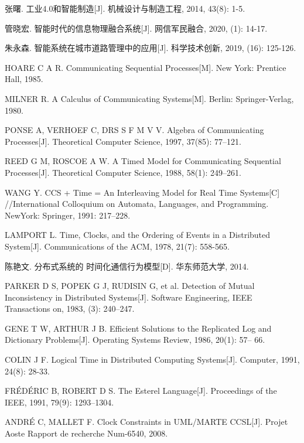 \begin{thebibliography}{2}
张曙. 工业4.0和智能制造[J]. 机械设计与制造工程, 2014, 43(8): 1-5.

管晓宏. 智能时代的信息物理融合系统[J]. 网信军民融合, 2020, (1): 14-17.

朱永森. 智能系统在城市道路管理中的应用[J]. 科学技术创新, 2019, (16): 125-126.

HOARE C A R. Communicating Sequential Processes[M]. New York: Prentice Hall, 1985.

MILNER R. A Calculus of Communicating Systems[M]. Berlin: Springer-Verlag, 1980.

PONSE A, VERHOEF C, DRS S F M V V. Algebra of Communicating Processes[J]. Theoretical Computer Science, 1997, 37(85): 77–121.

REED G M, ROSCOE A W. A Timed Model for Communicating Sequential Processes[J]. Theoretical Computer Science, 1988, 58(1): 249–261.

WANG Y. CCS + Time = An Interleaving Model for Real Time Systems[C] //International Colloquium on Automata, Languages, and Programming. NewYork: Springer, 1991: 217–228.

LAMPORT L. Time, Clocks, and the Ordering of Events in a Distributed System[J]. Communications of the ACM, 1978, 21(7): 558-565.

陈艳文. 分布式系统的 时间化通信行为模型[D]. 华东师范大学, 2014.

PARKER D S, POPEK G J, RUDISIN G, et al. Detection of Mutual Inconsistency in Distributed Systems[J]. Software Engineering, IEEE Transactions on, 1983, (3): 240–247.

GENE T W, ARTHUR J B. Efficient Solutions to the Replicated Log and Dictionary Problems[J]. Operating Systems Review, 1986, 20(1): 57– 66.

COLIN J F. Logical Time in Distributed Computing Systems[J]. Computer, 1991, 24(8): 28-33.

FR{\'E}D{\'E}RIC B, ROBERT D S. The Esterel Language[J]. Proceedings of the IEEE, 1991, 79(9): 1293–1304.

ANDR{\'E} C, MALLET F. Clock Constraints in UML/MARTE CCSL[J]. Projet Aoste Rapport de recherche Num-6540, 2008.


\end{thebibliography}
